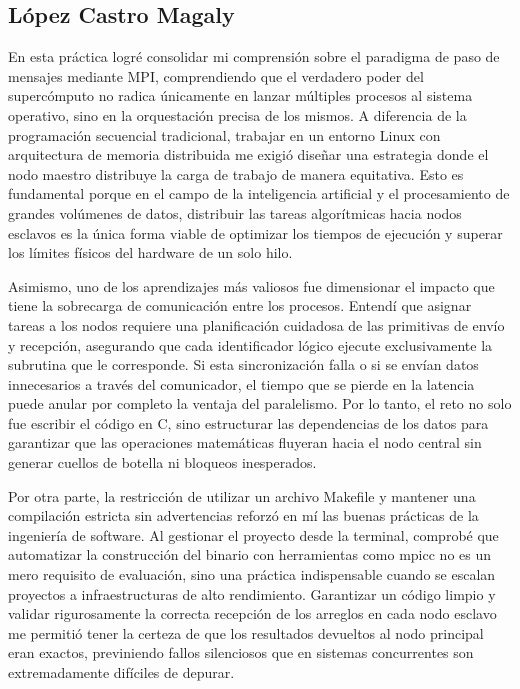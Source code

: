 \clearpage
\subsection{López Castro Magaly}
En esta práctica logré consolidar mi comprensión sobre el paradigma de paso de mensajes mediante MPI, comprendiendo que el verdadero poder del supercómputo no radica únicamente en lanzar múltiples procesos al sistema operativo, sino en la orquestación precisa de los mismos. A diferencia de la programación secuencial tradicional, trabajar en un entorno Linux con arquitectura de memoria distribuida me exigió diseñar una estrategia donde el nodo maestro distribuye la carga de trabajo de manera equitativa. Esto es fundamental porque en el campo de la inteligencia artificial y el procesamiento de grandes volúmenes de datos, distribuir las tareas algorítmicas hacia nodos esclavos es la única forma viable de optimizar los tiempos de ejecución y superar los límites físicos del hardware de un solo hilo.

Asimismo, uno de los aprendizajes más valiosos fue dimensionar el impacto que tiene la sobrecarga de comunicación entre los procesos. Entendí que asignar tareas a los nodos requiere una planificación cuidadosa de las primitivas de envío y recepción, asegurando que cada identificador lógico ejecute exclusivamente la subrutina que le corresponde. Si esta sincronización falla o si se envían datos innecesarios a través del comunicador, el tiempo que se pierde en la latencia puede anular por completo la ventaja del paralelismo. Por lo tanto, el reto no solo fue escribir el código en C, sino estructurar las dependencias de los datos para garantizar que las operaciones matemáticas fluyeran hacia el nodo central sin generar cuellos de botella ni bloqueos inesperados.

Por otra parte, la restricción de utilizar un archivo Makefile y mantener una compilación estricta sin advertencias reforzó en mí las buenas prácticas de la ingeniería de software. Al gestionar el proyecto desde la terminal, comprobé que automatizar la construcción del binario con herramientas como mpicc no es un mero requisito de evaluación, sino una práctica indispensable cuando se escalan proyectos a infraestructuras de alto rendimiento. Garantizar un código limpio y validar rigurosamente la correcta recepción de los arreglos en cada nodo esclavo me permitió tener la certeza de que los resultados devueltos al nodo principal eran exactos, previniendo fallos silenciosos que en sistemas concurrentes son extremadamente difíciles de depurar.

